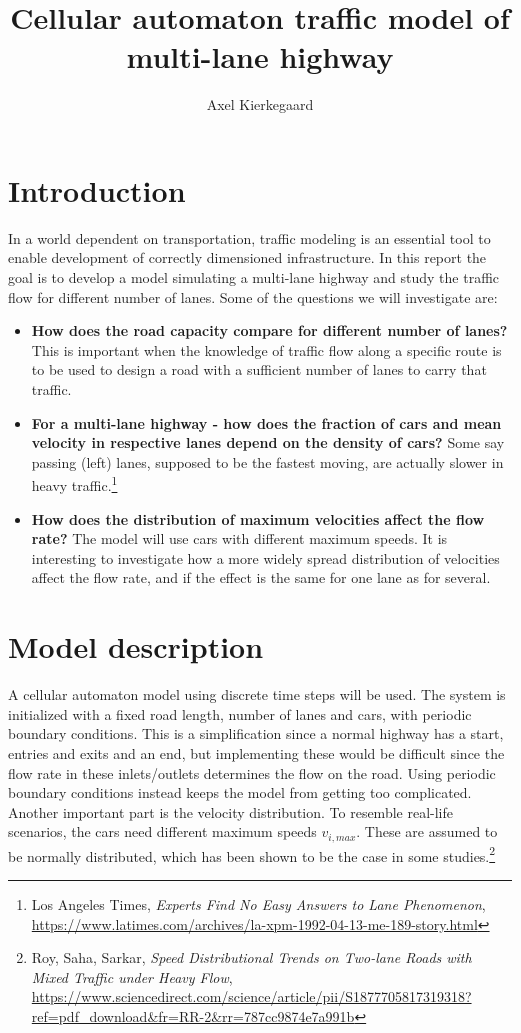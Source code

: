 \documentclass[a4paper,12pt]{article}
\title{Cellular automaton traffic model of multi-lane highway}
\author{Axel Kierkegaard}
\begin{document}
\maketitle

\section{Introduction}
In a world dependent on transportation, traffic modeling is an essential tool to enable development of correctly dimensioned infrastructure. In this report the goal is to develop a model simulating a multi-lane highway and study the traffic flow for different number of lanes. Some of the questions we will investigate are:

\begin{itemize}
  \item \textbf{How does the road capacity compare for different number of lanes?}
  This is important when the knowledge of traffic flow along a specific route is to be used to design a road with a sufficient number of lanes to carry that traffic.
  \item \textbf{For a multi-lane highway - how does the fraction of cars and mean velocity in respective lanes depend on the density of cars?} Some say passing (left) lanes, supposed to be the fastest moving, are actually slower in heavy traffic.\footnote{Los Angeles Times, \textit{Experts Find No Easy Answers to Lane Phenomenon}, \url{https://www.latimes.com/archives/la-xpm-1992-04-13-me-189-story.html}}
  \item \textbf{How does the distribution of maximum velocities affect the flow rate?} The model will use cars with different maximum speeds. It is interesting to investigate how a more widely spread distribution of velocities affect the flow rate, and if the effect is the same for one lane as for several.
\end{itemize}

\section{Model description}
A cellular automaton model using discrete time steps will be used. The system is initialized with a fixed road length, number of lanes and cars, with periodic boundary conditions. This is a simplification since a normal highway has a start, entries and exits and an end, but implementing these would be difficult since the flow rate in these inlets/outlets determines the flow on the road. Using periodic boundary conditions instead keeps the model from getting too complicated. Another important part is the velocity distribution. To resemble real-life scenarios, the cars need different maximum speeds $v_{i, max}$. These are assumed to be normally distributed, which has been shown to be the case in some studies.\footnote{Roy, Saha, Sarkar, \textit{Speed Distributional Trends on Two-lane Roads with Mixed Traffic under Heavy Flow}, \url{https://www.sciencedirect.com/science/article/pii/S1877705817319318?ref=pdf_download&fr=RR-2&rr=787cc9874e7a991b}}\\
\end{document}
